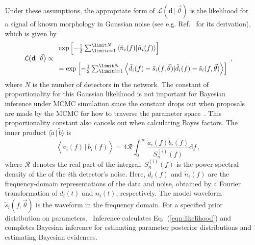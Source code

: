 Under these assumptions, the appropriate form of $\mathcal{L}(\mathbf{d} \, | \, \vec{\theta})$
is the likelihood for a signal of known morphology in Gaussian noise (see
e.g.  Ref.~\cite{wainstein:1962} for its derivation), which is
given by
\begin{equation}\label{eqn:likelihood}
    \mathcal{L}(\mathbf{d} \, | \, \vec{\theta}) \propto \begin{array}{l}
              \exp \left[ -\frac{1}{2} \sum_{\limit i = 1}^{\limit N} \left \langle \tilde{n}_{i}(f) | \tilde{n}_{i}(f)\right\rangle \right] \\ \\ 
      = \exp \left[ -\frac{1}{2} \sum_{\limit i = 1}^{\limit N} \left \langle \tilde{d}_{i}(f) - \tilde{s}_{i}(f, \vec{\theta})| \tilde{d}_{i}(f) - \tilde{s}_{i}(f, \vec{\theta})\right \rangle \right]
             \end{array},
\end{equation}
where $N$ is the number of detectors in the network. The constant of proportionality for this Gaussian likelihood
is not important for Bayesian inference under MCMC simulation since the constant drops out
when proposals are made by the MCMC for how to traverse the parameter space~\cite{cbiwer_thesis}.
This proportionality constant also cancels out when calculating Bayes factors.
The inner product $\langle\tilde{a} \, | \, \tilde{b}\rangle$ is
\begin{equation}
    \left \langle \tilde{a}_i(f) \, | \, \tilde{b}_i(f)\right \rangle = 4 \mathcal{R} \int_{0}^{\infty} \frac{\tilde{a}_i(f) \tilde{b}_i(f)}{S^{(i)}_n(f)} \mathrm{d}f \,,
\end{equation}
where $\mathcal{R}$ denotes the real part of the integral,
$S^{(i)}_n(f)$ is the power spectral density of the of the $i$th
detector's noise. Here, $\tilde{d}_{i}(f)$ and $\tilde{n}_{i}(f)$ are the
frequency-domain representations of the data and noise, obtained by a Fourier
transformation of $d_{i}(t)$ and $n_{i}(t)$, respectively. The model waveform
$\tilde{s}_{i}(f, \vec{\theta})$ is the waveform in the frequency domain.
For a specified prior distribution on parameters,
\pycbc{}\ Inference calculates Eq.~(\ref{eqn:likelihood}) and
completes Bayesian inference for estimating parameter posterior distributions and
estimating Bayesian evidences.

